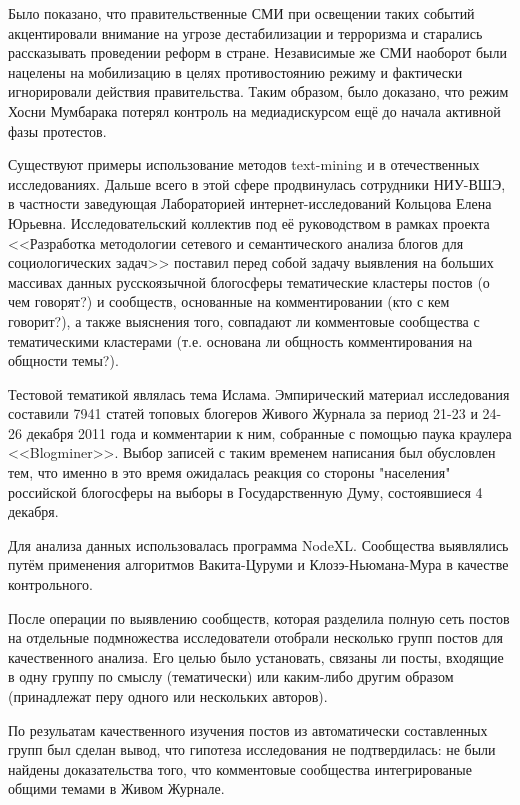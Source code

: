 Было показано, что правительственные СМИ при освещении таких событий акцентировали внимание на угрозе дестабилизации и терроризма и старались рассказывать проведении реформ в стране. Независимые же СМИ наоборот были нацелены на мобилизацию в целях противостоянию режиму и фактически игнорировали действия правительства. Таким образом, было доказано, что режим Хосни Мумбарака потерял контроль на медиадискурсом ещё до начала активной фазы протестов.


Существуют примеры использование методов text-mining и в отечественных исследованиях. Дальше всего в этой сфере продвинулась сотрудники НИУ-ВШЭ, в частности заведующая Лабораторией интернет-исследований Кольцова Елена Юрьевна. Исследовательский коллектив под её руководством в рамках проекта <<Разработка методологии сетевого и семантического анализа блогов для социологических задач>> поставил перед собой задачу выявления на больших массивах данных русскоязычной блогосферы тематические кластеры постов (о чем говорят?) и сообществ, основанные на комментировании (кто с кем говорит?), а также выяснения того, совпадают ли комментовые сообщества с тематическими кластерами (т.е. основана ли общность комментирования на общности темы?).

Тестовой тематикой являлась тема Ислама. Эмпирический материал исследования составили 7941 статей топовых блогеров Живого Журнала за период 21-23 и 24-26 декабря 2011 года и комментарии к ним, собранные с помощью паука краулера <<Blogminer>>. Выбор записей с таким временем написания был обусловлен тем, что именно в это время ожидалась реакция со стороны "населения" российской блогосферы на выборы в Государственную Думу, состоявшиеся 4 декабря.

Для анализа данных использовалась программа NodeXL. Сообщества выявлялись путём применения алгоритмов Вакита-Цуруми и Клозэ-Ньюмана-Мура в качестве контрольного.

После операции по выявлению сообществ, которая разделила полную сеть постов на отдельные подмножества исследователи отобрали несколько групп постов для качественного анализа. Его целью было установать, связаны ли посты, входящие в одну группу по смыслу (тематически) или каким-либо другим образом (принадлежат перу одного или нескольких авторов).

По резульатам качественного изучения постов из автоматически составленных групп был сделан вывод, что гипотеза исследования не подтвердилась: не были найдены доказательства того, что комментовые сообщества интегрированые общими темами в Живом Журнале.

